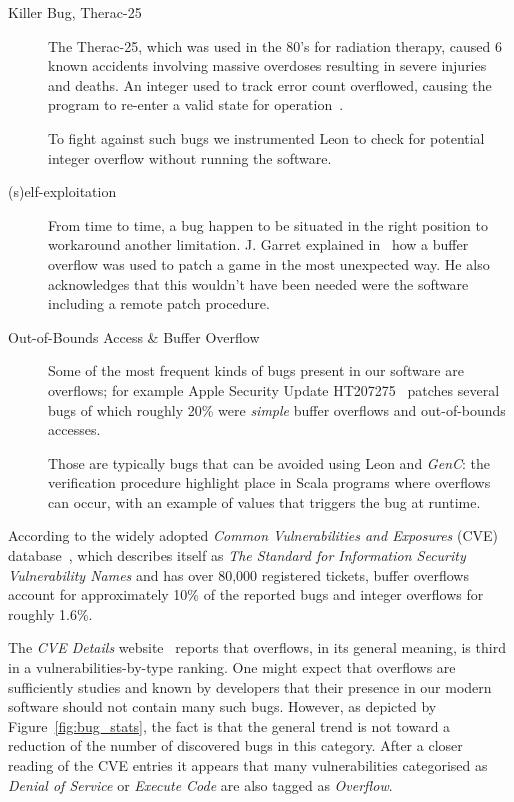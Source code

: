 \documentclass[a4paper,twoside]{article}
\newcommand{\GenC}{\emph{GenC}\xspace}
\newcommand{\RefFig}[1]{Figure~\ref{#1}}
\begin{document}
\begin{description}

\item[Killer Bug, Therac-25]

The Therac-25, which was used in the 80's for radiation therapy, caused 6 known
accidents involving massive overdoses resulting in severe injuries and deaths. An
integer used to track error count overflowed, causing the program to re-enter a
valid state for operation~\cite{Leveson:1993:ITA:161477.161479}.

To fight against such bugs we instrumented Leon to check for potential integer
overflow without running the software.

\item[(s)elf-exploitation]

From time to time, a bug happen to be situated in the right position to
workaround another limitation. J. Garret explained in~\cite{self_exploitation}
how a buffer overflow was used to patch a game in the most unexpected way. He
also acknowledges that this wouldn't have been needed were the software
including a remote patch procedure.

\item[Out-of-Bounds Access \& Buffer Overflow]

Some of the most frequent kinds of bugs present in our software are overflows;
for example Apple Security Update HT207275~\cite{HT207275} patches several bugs
of which roughly 20\% were \emph{simple} buffer overflows and out-of-bounds
accesses.

Those are typically bugs that can be avoided using Leon and \GenC: the
verification procedure highlight place in Scala programs where overflows
can occur, with an example of values that triggers the bug at runtime.

\end{description}

According to the widely adopted \emph{Common Vulnerabilities and Exposures}
(CVE) database~\cite{cve}, which describes itself as \textit{The Standard for
Information Security Vulnerability Names} and has over 80,000 registered
tickets, buffer overflows account for approximately 10\% of the reported bugs
and integer overflows for roughly 1.6\%.

The \emph{CVE Details} website~\cite{cvedetails} reports that overflows, in its
general meaning, is third in a vulnerabilities-by-type ranking. One might expect
that overflows are sufficiently studies and known by developers that their
presence in our modern software should not contain many such bugs. However, as
depicted by \RefFig{fig:bug_stats}, the fact is that the general trend is not
toward a reduction of the number of discovered bugs in this category. After a
closer reading of the CVE entries it appears that many vulnerabilities
categorised as \emph{Denial of Service} or \emph{Execute Code} are also tagged
as \emph{Overflow}.
\end{document}
